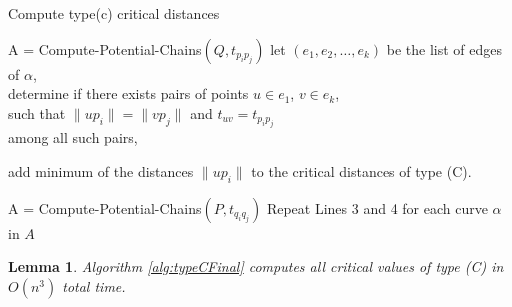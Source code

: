 \documentclass[12pt]{dalthesis}
\newtheorem{lemma}[theorem]{Lemma}
\newcommand{\REM}[1]{}
\begin{document}
 \begin{algorithm} [t]
\caption {\sc Compute type(c) critical distances} \label{alg:typeCFinal}
\begin{algorithmic}[1]

\STATE A = {\sc Compute-Potential-Chains$(Q, t_{p_ip_j})$}
\STATE let $(e_1, e_2, \dots, e_k)$ be the list of edges of $\alpha$, \\
 determine if there exists pairs of points $u \in e_1$, $v \in e_k$, \\
such that $\| up_i  \| = \| vp_j\|$ and $t_{uv} =  t_{p_ip_j}$
\\
among all such pairs, 

add  minimum of the distances $\| up_i \|$ to the critical distances of type (C).
\ENDFOR	
\ENDFOR	


\STATE A = {\sc Compute-Potential-Chains$(P, t_{q_iq_j})$}
\STATE Repeat Lines 3 and 4 for each curve $\alpha$ in $A$ \label{l:reprep} \ENDFOR	

\REM{
\FOR { each $q_i, q_j, i, j \le m$}
\STATE B = $Compute-Potential-Chains(P, t_{q_iq_j})$
\FOR{each curve $\beta$ in B}
\STATE determine if a point $u$ exists on the first edge of $\beta$, \\
and a point $v$ exists on the last edge of $\beta$, \\
such that $\| uq_i  \| = \| vq_j\|$. \\
if exists, add distance $\| uq_i \|$ to critical distance of type (C)

\ENDFOR	
\ENDFOR		
}

\end{algorithmic}
\end{algorithm}




\begin{lemma}
\label{TimeOfTypeC}
Algorithm \ref{alg:typeCFinal} computes all critical values of type (C) 
in $O(n^3)$ total time. 
\end{lemma}
\end{document}
